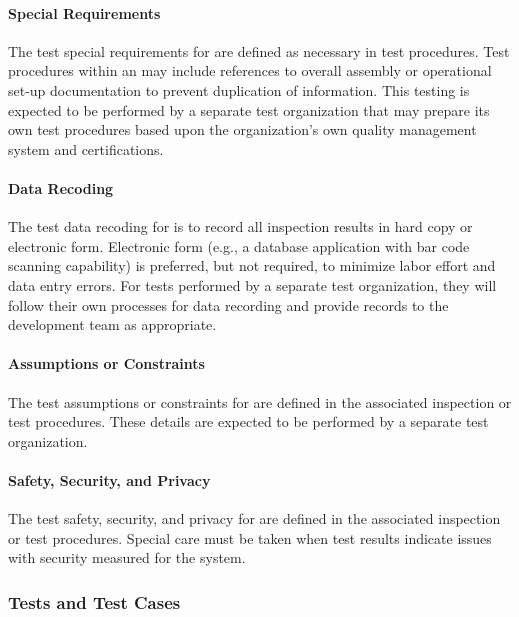 \paragraph{Special Requirements}
\label{loc:TestSpecialRequirements\TestIdName}

The test special requirements for \TestIdNameX are defined as necessary in test procedures.
Test procedures within an \STS may include references to overall assembly or operational set-up documentation to prevent duplication of information.
This testing is expected to be performed by a separate test organization that may prepare its own test procedures based upon the organization's own quality management system and certifications.

\paragraph{Data Recoding}
\label{loc:TestDataRecoding\TestIdName}

The test data recoding for \TestIdNameX is to record all inspection results in hard copy or electronic form.
Electronic form (e.g., a database application with bar code scanning capability) is preferred, but not required, to minimize labor effort and data entry errors.
For tests performed by a separate test organization, they will follow their own processes for data recording and provide records to the development team as appropriate.

\paragraph{Assumptions or Constraints}
\label{loc:TestAssumptionsOrConstraints\TestIdName}

The test assumptions or constraints for \TestIdNameX are defined in the associated inspection or test procedures.
These details are expected to be performed by a separate test organization.

\paragraph{Safety, Security, and Privacy}
\label{loc:TestSafetySecurityPrivacy\TestIdName}

The test safety, security, and privacy for \TestIdNameX are defined in the associated inspection or test procedures.
Special care must be taken when test results indicate issues with security measured for the system.

\subsubsection{Tests and Test Cases}
\label{loc:TestsAndTestCases\TestIdName}

